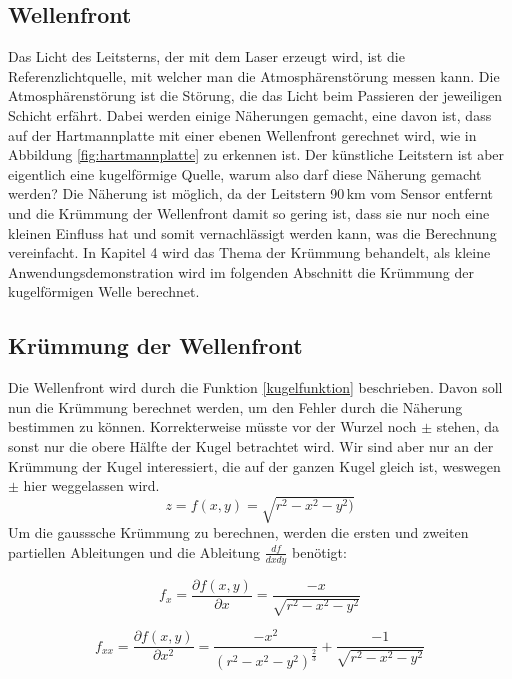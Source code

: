 \begin{refsection}
\section{Wellenfront}
Das Licht des Leitsterns, der mit dem Laser erzeugt wird, ist die
%
Referenzlichtquelle, mit welcher man die Atmosphärenstörung messen
kann. Die Atmosphärenstörung ist die Störung, die das Licht beim
Passieren der jeweiligen Schicht erfährt. Dabei werden einige Näherungen
gemacht, eine davon ist, dass auf der Hartmannplatte mit einer ebenen
Wellenfront gerechnet wird, wie in Abbildung \ref{fig:hartmannplatte}
zu erkennen ist. Der künstliche Leitstern ist aber eigentlich eine
kugelförmige Quelle, warum also darf diese Näherung gemacht werden? Die
Näherung ist möglich, da der Leitstern 90\,km vom Sensor entfernt
und die Krümmung der Wellenfront damit so gering ist, dass sie nur
noch eine kleinen Einfluss hat und somit vernachlässigt werden kann,
was die Berechnung vereinfacht. In Kapitel 4 wird das Thema der Krümmung
behandelt, als kleine Anwendungsdemonstration wird im folgenden Abschnitt
die Krümmung der kugelförmigen Welle berechnet.

\subsection{Krümmung der Wellenfront}
Die Wellenfront wird durch die Funktion \eqref{kugelfunktion} beschrieben. Davon soll nun die Krümmung berechnet werden, um den Fehler durch die Näherung bestimmen zu können. Korrekterweise müsste vor der Wurzel noch $\pm$ stehen, da sonst nur die obere Hälfte der Kugel betrachtet wird. Wir sind aber nur an der Krümmung der Kugel interessiert, die auf der ganzen Kugel gleich ist, weswegen  $\pm$ hier weggelassen wird.
\begin{equation}\label{kugelfunktion}
z=f(x,y)=\sqrt{r^{2}-x^{2}-y^{2})}
\end{equation}
Um die gausssche Krümmung zu berechnen, werden die ersten und zweiten partiellen Ableitungen und die Ableitung $ \frac{df}{dxdy}$ benötigt:

\begin{equation}\label{Ableitungen x}
f_{x}=\dfrac{\partial f(x,y)}{\partial x}= \dfrac{-x}{\sqrt{r^{2}-x^{2}-y^{2}}}
\end{equation}

\begin{equation}\label{Ableitungen xx}
f_{xx}=\dfrac{\partial f(x,y)}{\partial x^{2}}= \dfrac{- x^2}{(r^2 - x^2 - y^2)^{\frac{2}{3}}}+\dfrac{ - 1}{\sqrt{r^2 - x^2 - y^2}}
\end{equation}


\end{refsection}
